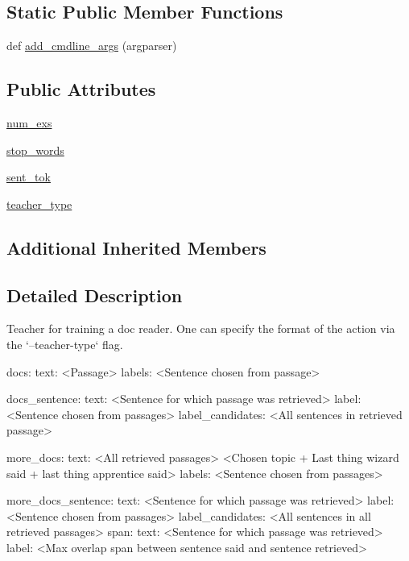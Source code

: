 \subsection*{Static Public Member Functions}
\begin{DoxyCompactItemize}
\item 
def \hyperlink{classparlai_1_1tasks_1_1wizard__of__wikipedia_1_1agents_1_1DocreaderTeacher_a4c307fc0411f560ff9ccf0bdd8a794ef}{add\+\_\+cmdline\+\_\+args} (argparser)
\end{DoxyCompactItemize}
\subsection*{Public Attributes}
\begin{DoxyCompactItemize}
\item 
\hyperlink{classparlai_1_1tasks_1_1wizard__of__wikipedia_1_1agents_1_1DocreaderTeacher_a5c7fd889baaca59e8d1bcb105084cc4a}{num\+\_\+exs}
\item 
\hyperlink{classparlai_1_1tasks_1_1wizard__of__wikipedia_1_1agents_1_1DocreaderTeacher_a3f6ba852ce8621883a21c1f4fadb9814}{stop\+\_\+words}
\item 
\hyperlink{classparlai_1_1tasks_1_1wizard__of__wikipedia_1_1agents_1_1DocreaderTeacher_adfa0a51acde58e5cbfa9553b06594852}{sent\+\_\+tok}
\item 
\hyperlink{classparlai_1_1tasks_1_1wizard__of__wikipedia_1_1agents_1_1DocreaderTeacher_a4582a196ca5c413be227f84c48afb4b5}{teacher\+\_\+type}
\end{DoxyCompactItemize}
\subsection*{Additional Inherited Members}


\subsection{Detailed Description}
\begin{DoxyVerb}Teacher for training a doc reader. One can specify the format of the action via the
`--teacher-type` flag.

docs:
    {
        text: <Passage> 
        labels: <Sentence chosen from passage>
    }

docs_sentence:
    {
        text: <Sentence for which passage was retrieved>
        label: <Sentence chosen from passages>
        label_candidates: <All sentences in retrieved passage>
    }

more_docs:
    {
        text: <All retrieved passages> \n
              <Chosen topic + Last thing wizard said + last thing apprentice said>
        labels: <Sentence chosen from passages>
    }

more_docs_sentence:
    {
        text: <Sentence for which passage was retrieved>
        label: <Sentence chosen from passages>
        label_candidates: <All sentences in all retrieved passages>
    }
span:
    {
        text: <Sentence for which passage was retrieved>
        label: <Max overlap span between sentence said and sentence retrieved>
    }
\end{DoxyVerb}
 


